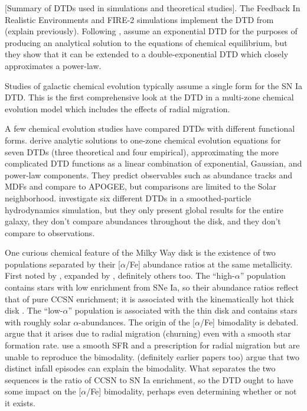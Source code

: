 \documentclass[modern,linenumbers]{aastex631}
\newcommand{\aFe}{[$\alpha$/Fe]\xspace}
\begin{document}
[Summary of DTDs used in simulations and theoretical studies]. The Feedback In Realistic Environments \citep[FIRE;][]{Hopkins2014-FIRE-1} and FIRE-2 \citep{Hopkins2018-FIRE-2} simulations implement the DTD from \citet{Mannucci2006-TwoPopulations} (explain previously). Following \citet{Schonrich2009-RadialMixing}, \citet{Weinberg2017-ChemicalEquilibrium} assume an exponential DTD for the purposes of producing an analytical solution to the equations of chemical equilibrium, but they show that it can be extended to a double-exponential DTD which closely approximates a power-law. 

Studies of galactic chemical evolution typically assume a single form for the SN Ia DTD. This is the first comprehensive look at the DTD in a multi-zone chemical evolution model which includes the effects of radial migration.

A few chemical evolution studies have compared DTDs with different functional forms. \citet{Palicio2023-AnalyticDTD} derive analytic solutions to one-zone chemical evolution equations for seven DTDs (three theoretical and four empirical), approximating the more complicated DTD functions as a linear combination of exponential, Gaussian, and power-law components. They predict observables such as abundance tracks and MDFs and compare to APOGEE, but comparisons are limited to the Solar neighborhood. \citet{Poulhazan2018-PrecisionPollution} investigate six different DTDs in a smoothed-particle hydrodynamics simulation, but they only present global results for the entire galaxy, they don't compare abundances throughout the disk, and they don't compare to observations.

One curious chemical feature of the Milky Way disk is the existence of two populations separated by their \aFe abundance ratios at the same metallicity. First noted by \citet{Furhmann1998-NearbyStars}, expanded by \citet{Hayden2015-ChemicalCartography}, definitely others too. The ``high-$\alpha$'' population contains stars with low enrichment from SNe Ia, so their abundance ratios reflect that of pure CCSN enrichment; it is associated with the kinematically hot thick disk \citep{Bensby2003-AbundanceTrends}. The ``low-$\alpha$'' population is associated with the thin disk and contains stars with roughly solar $\alpha$-abundances.
The origin of the \aFe bimodality is debated. \citet{Schonrich2009-RadialMixing} argue that it arises due to radial migration (churning) even with a smooth star formation rate. \citet{Johnson2021-Migration} use a smooth SFR and a prescription for radial migration but are unable to reproduce the bimodality. \citet{Spitoni2021-TwoInfall} (definitely earlier papers too) argue that two distinct infall episodes can explain the bimodality. What separates the two sequences is the ratio of CCSN to SN Ia enrichment, so the DTD ought to have some impact on the \aFe bimodality, perhaps even determining whether or not it exists.
\end{document}
